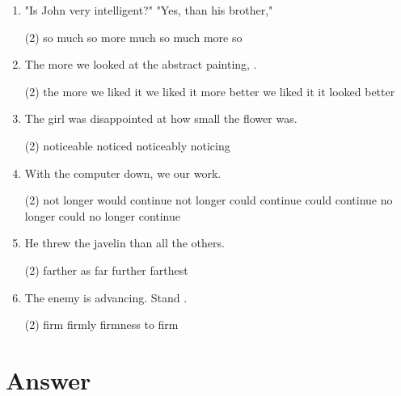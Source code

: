 \begin{enumerate}
\item "Is John very intelligent?" "Yes, \ttu than his brother,"
  \begin{tasks}(2)
    \task so much
    \task so more
    \task much so
    \task much more so
  \end{tasks}

\item The more we looked at the abstract painting, \ttu.
  \begin{tasks}(2)
    \task the more we liked it
    \task we liked it more
    \task better we liked it
    \task it looked better
  \end{tasks}

\item The girl was \ttu disappointed at how small the flower was.
  \begin{tasks}(2)
    \task noticeable
    \task noticed
    \task noticeably
    \task noticing
  \end{tasks}

\item With the computer down, we \ttu our work.
  \begin{tasks}(2)
    \task not longer would continue
    \task not longer could continue
    \task could continue no longer
    \task could no longer continue
  \end{tasks}

\item He threw the javelin \ttu than all the others.
  \begin{tasks}(2)
    \task farther
    \task as far
    \task further
    \task farthest
  \end{tasks}

\item The enemy is advancing. Stand \ttu.
  \begin{tasks}(2)
    \task firm
    \task firmly
    \task firmness
    \task to firm
  \end{tasks}

\end{enumerate}

\section{Answer}

